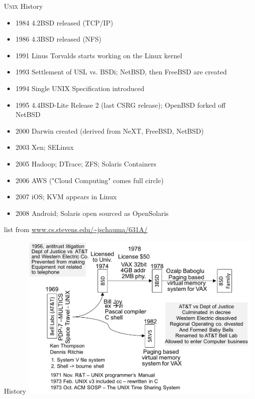 \documentclass[newPxFont,sthlmFooter,nooffset]{beamer}
\begin{document}
\begin{frame}[t]{\textsc{Unix} History}
\begin{itemize}\small
	\item 1984 4.2BSD released (TCP/IP)
	\item 1986 4.3BSD released (NFS)
	\item 1991 Linus Torvalds starts working on the Linux kernel
	\item 1993 Settlement of USL vs. BSDi; NetBSD, then FreeBSD are created
	\item 1994 Single UNIX Specification introduced
	\item 1995 4.4BSD-Lite Release 2 (last CSRG release); OpenBSD
		forked off NetBSD
	\item 2000 Darwin created (derived from NeXT, FreeBSD, NetBSD)
	\item 2003 Xen; SELinux
	\item 2005 Hadoop; DTrace; ZFS; Solaris Containers
	\item 2006 AWS ("Cloud Computing" comes full circle)
	\item 2007 iOS; KVM appears in Linux
	\item 2008 Android; Solaris open sourced as OpenSolaris
\end{itemize}

list from \url{www.cs.stevens.edu/~jschauma/631A/}

\end{frame}



\begin{frame}[c]{History}
\centering
\includegraphics[width=0.9\textwidth]{./figure/history_1.png}
\end{frame}
\end{document}
